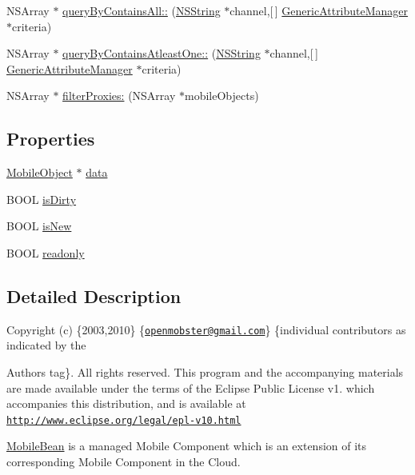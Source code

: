 \begin{DoxyCompactItemize}
\item 
\-N\-S\-Array $\ast$ \hyperlink{interface_mobile_bean_aeeb2ead229395df6dd1f7ba197352856}{query\-By\-Contains\-All\-::} (\hyperlink{class_n_s_string}{\-N\-S\-String} $\ast$channel,\mbox{[}$\,$\mbox{]} \hyperlink{interface_generic_attribute_manager}{\-Generic\-Attribute\-Manager} $\ast$criteria)
\item 
\-N\-S\-Array $\ast$ \hyperlink{interface_mobile_bean_a8eaecfd835a3424471964b88e12b9b95}{query\-By\-Contains\-Atleast\-One\-::} (\hyperlink{class_n_s_string}{\-N\-S\-String} $\ast$channel,\mbox{[}$\,$\mbox{]} \hyperlink{interface_generic_attribute_manager}{\-Generic\-Attribute\-Manager} $\ast$criteria)
\item 
\-N\-S\-Array $\ast$ \hyperlink{interface_mobile_bean_a9fb574b192ae78c2a18f24701b997a32}{filter\-Proxies\-:} (\-N\-S\-Array $\ast$mobile\-Objects)
\end{DoxyCompactItemize}
\subsection*{\-Properties}
\begin{DoxyCompactItemize}
\item 
\hyperlink{interface_mobile_object}{\-Mobile\-Object} $\ast$ \hyperlink{interface_mobile_bean_afbb725368f73fc95c7896c466e6ab913}{data}
\item 
\-B\-O\-O\-L \hyperlink{interface_mobile_bean_a13520d7327987f517659625a25290036}{is\-Dirty}
\item 
\-B\-O\-O\-L \hyperlink{interface_mobile_bean_adfb5677488f58845e4873d8b1edfe15d}{is\-New}
\item 
\-B\-O\-O\-L \hyperlink{interface_mobile_bean_a9d7d56a7ab0d2e868ebd251fd1582861}{readonly}
\end{DoxyCompactItemize}


\subsection{\-Detailed \-Description}
\-Copyright (c) \{2003,2010\} \{\href{mailto:openmobster@gmail.com}{\tt openmobster@gmail.\-com}\} \{individual contributors as indicated by the \begin{DoxyAuthor}{\-Authors}
tag\}. \-All rights reserved. \-This program and the accompanying materials are made available under the terms of the \-Eclipse \-Public \-License v1. which accompanies this distribution, and is available at \href{http://www.eclipse.org/legal/epl-v10.html}{\tt http\-://www.\-eclipse.\-org/legal/epl-\/v10.\-html}
\end{DoxyAuthor}
\hyperlink{interface_mobile_bean}{\-Mobile\-Bean} is a managed \-Mobile \-Component which is an extension of its corresponding \-Mobile \-Component in the \-Cloud.


